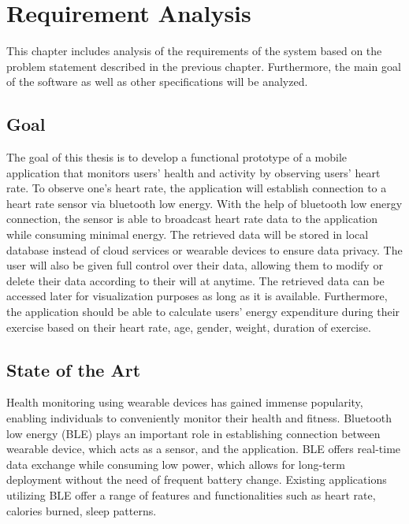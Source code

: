 \chapter{Requirement Analysis}
This chapter includes analysis of the requirements of the system based on the problem statement described in the previous chapter. Furthermore, the main goal of the software as well as other specifications will be analyzed.

\section{Goal}
The goal of this thesis is to develop a functional prototype of a mobile application that monitors users' health and activity by observing users' heart rate. To observe one's heart rate, the application will establish connection to a heart rate sensor via bluetooth low energy.
With the help of bluetooth low energy connection, the sensor is able to broadcast heart rate data to the application while consuming minimal energy.
The retrieved data will be stored in local database instead of cloud services or wearable devices to ensure data privacy. The user will also be given full control over their data, allowing them to modify or delete their data according to their will at anytime.
The retrieved data can be accessed later for visualization purposes as long as it is available. Furthermore, the application should be able to calculate users' energy expenditure during their exercise based on their heart rate, age, gender, weight, duration of exercise.

\section{State of the Art}
Health monitoring using wearable devices has gained immense popularity, enabling individuals to conveniently monitor their health and fitness. Bluetooth low energy (BLE) plays an important role in establishing connection between wearable device, which acts as a sensor, and the application. 
BLE offers real-time data exchange while consuming low power, which allows for long-term deployment without the need of frequent battery change. \cite{strey2013ble}
Existing applications utilizing BLE offer a range of features and functionalities such as heart rate, calories burned, sleep patterns.


